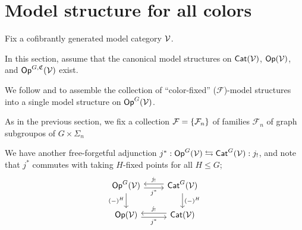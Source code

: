 \documentclass[a4paper,10pt
,draft
]{article}%
\renewcommand{\F}{\mathcal F}
\renewcommand{\1}{\ensuremath{\mathbb{id}}}
\begin{document}
\newpage

\section{Model structure for all colors} 
\renewcommand{\C}{\mathfrak C}

Fix a cofibrantly generated model category $\mathcal V$.

{\color{OliveGreen} In this section, assume that the canonical model structures on $\mathsf{Cat}(\mathcal V)$, $\mathsf{Op}(\mathcal V)$, and $\Op^{G,\C}(\V)$ exist.}

We follow \cite{BM13} and \cite{Cav14} to assemble the collection of ``color-fixed''
($\F$)-model structures into
a single model structure on $\mathsf{Op}^G(\mathcal V)$.

As in the previous section, we fix a collection $\F = \set{\F_n}$ of families $\F_n$ of graph subgroupos of $G \times \Sigma_n$

We have another free-forgetful adjunction $j^*: \mathsf{Op}^G(\mathcal V) \leftrightarrows \mathsf{Cat}^G(\mathcal V): j_!$, and note that $j^*$ commutes with taking $H$-fixed points for all $H\leq G$;
\begin{equation}
      \begin{tikzcd}
            \mathsf{Op}^G(\V) \arrow[d, "(-)^H"']
            \arrow[r, shift right, "j^*"']
            &
            \mathsf{Cat}^G(\V) \arrow[l, shift right, swap, "j_!"] \arrow[d, "(-)^H"]
            \\
            \Op(\V) \arrow[r, shift right, "j^*"']
            &
            \Cat(\V) \arrow[l, shift right, swap, "j_!"]
      \end{tikzcd}
\end{equation}


\end{document}
